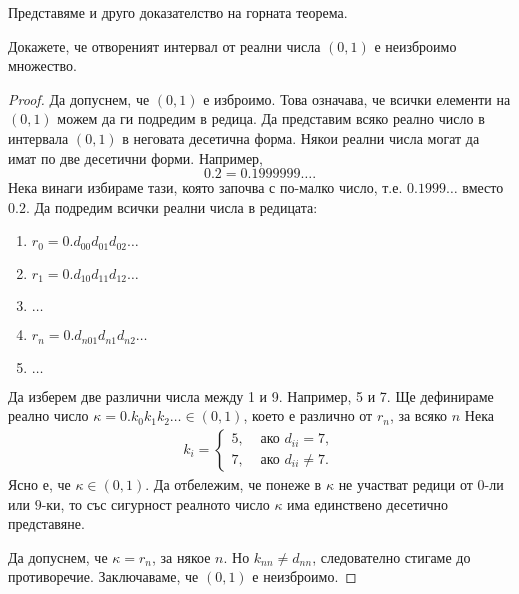 Представяме и друго доказателство на горната теорема.
\begin{problem}
  Докажете, че отвореният интервал от реални числа $(0,1)$ е неизброимо множество.
\end{problem}
\begin{proof}
  Да допуснем, че $(0,1)$ е изброимо. Това означава, че всички елементи на $(0,1)$ можем да ги подредим в редица.
  Да представим всяко реално число в интервала $(0,1)$ в неговата десетична форма.
  Някои реални числа могат да имат по две десетични форми.
  Например, 
  \[0.2 = 0.1999999\dots.\]
  Нека винаги избираме тази, която започва с по-малко число, т.е.  $0.1999\dots$ вместо $0.2$.
  Да подредим всички реални числа в редицата:
  \begin{enumerate}[]
  \item
    $r_0 = 0.d_{00}d_{01}d_{02}\dots$
  \item
    $r_1 = 0.d_{10}d_{11}d_{12}\dots$
  \item
    $\dots$
  \item
    $r_n = 0.d_{n01}d_{n1}d_{n2}\dots$
  \item
    $\dots$
  \end{enumerate}

  Да изберем две различни числа между 1 и 9. Например, 5 и 7.
  Ще дефинираме реално число $\kappa=0.k_0k_1k_2\dots \in (0,1)$, което е различно от $r_n$, за всяко $n$
  Нека 
  \begin{align*}
    k_i = 
    \begin{cases}
      5, & \mbox{ ако } d_{ii} = 7,\\
      7, & \mbox{ ако } d_{ii} \neq 7.
    \end{cases}
  \end{align*}
  Ясно е, че $\kappa \in (0,1)$.
  Да отбележим, че понеже в $\kappa$ не участват редици от $0$-ли или $9$-ки, то със сигурност 
  реалното число $\kappa$ има единствено десетично представяне.

  Да допуснем, че $\kappa = r_n$, за някое $n$.
  Но $k_{nn} \neq d_{nn}$, следователно стигаме до противоречие.
  Заключаваме, че $(0,1)$ е неизброимо.
\end{proof}


